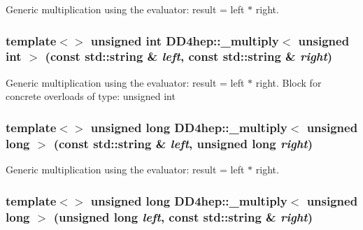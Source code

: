 Generic multiplication using the evaluator: result = left $\ast$ right. \hypertarget{group___d_d4_h_e_p___g_e_o_m_e_t_r_y_ga98d2080e984813108ebf14ea52c47482}{
\subsubsection[{\_\-multiply$<$ unsigned int $>$}]{\setlength{\rightskip}{0pt plus 5cm}template$<$$>$ unsigned int DD4hep::\_\-multiply$<$ unsigned int $>$ (const std::string \& {\em left}, \/  const std::string \& {\em right})}}
\label{group___d_d4_h_e_p___g_e_o_m_e_t_r_y_ga98d2080e984813108ebf14ea52c47482}


Generic multiplication using the evaluator: result = left $\ast$ right. Block for concrete overloads of type: unsigned int \hypertarget{group___d_d4_h_e_p___g_e_o_m_e_t_r_y_ga8aa5b607a42dc3d9b9edec97bcdeea04}{
\subsubsection[{\_\-multiply$<$ unsigned long $>$}]{\setlength{\rightskip}{0pt plus 5cm}template$<$$>$ unsigned long DD4hep::\_\-multiply$<$ unsigned long $>$ (const std::string \& {\em left}, \/  unsigned long {\em right})}}
\label{group___d_d4_h_e_p___g_e_o_m_e_t_r_y_ga8aa5b607a42dc3d9b9edec97bcdeea04}


Generic multiplication using the evaluator: result = left $\ast$ right. \hypertarget{group___d_d4_h_e_p___g_e_o_m_e_t_r_y_ga9515f40b1758ccada5e44814fa5ef21a}{
\subsubsection[{\_\-multiply$<$ unsigned long $>$}]{\setlength{\rightskip}{0pt plus 5cm}template$<$$>$ unsigned long DD4hep::\_\-multiply$<$ unsigned long $>$ (unsigned long {\em left}, \/  const std::string \& {\em right})}}
\label{group___d_d4_h_e_p___g_e_o_m_e_t_r_y_ga9515f40b1758ccada5e44814fa5ef21a}


